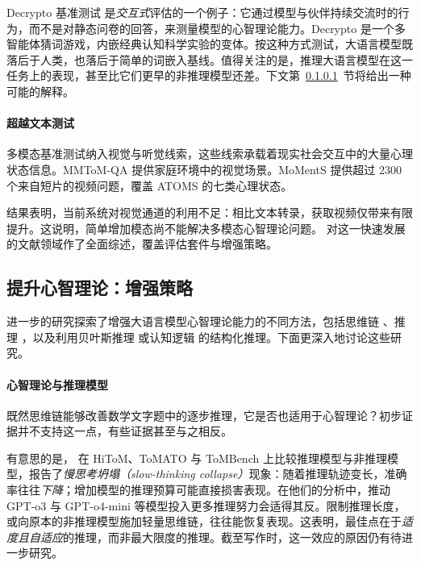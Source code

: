 Decrypto 基准测试 \citep{lupu2025decrypto} 是\emph{交互式}评估的一个例子：它通过模型与伙伴持续交流时的行为，而不是对静态问卷的回答，来测量模型的心智理论能力。Decrypto 是一个多智能体猜词游戏，内嵌经典认知科学实验的变体。按这种方式测试，大语言模型既落后于人类，也落后于简单的词嵌入基线。值得关注的是，推理大语言模型在这一任务上的表现，甚至比它们更早的非推理模型还差。下文第~\ref{sec:tomreasoning}~节将给出一种可能的解释。

\paragraph{超越文本测试}
多模态基准测试纳入视觉与听觉线索，这些线索承载着现实社会交互中的大量心理状态信息。MMToM-QA \cite{jin2024mmtomqamultimodaltheorymind} 提供家庭环境中的视觉场景。MoMentS \citep{villa2025moments} 提供超过 2300 个来自短片的视频问题，覆盖 ATOMS 的七类心理状态。

结果表明，当前系统对视觉通道的利用不足：相比文本转录，获取视频仅带来有限提升。这说明，简单增加模态尚不能解决多模态心智理论问题。\citet{chen-etal-2025-theory} 对这一快速发展的文献领域作了全面综述，覆盖评估套件与增强策略。

\subsection{提升心智理论：增强策略} \label{sec:enhancement}
进一步的研究探索了增强大语言模型心智理论能力的不同方法，包括思维链 \citep{moghaddam2023boostingtheoryofmindperformancelarge}、推理 \citep{kim2025hypothesis}，以及利用贝叶斯推理 \citep{jin2024mmtomqamultimodaltheorymind}或认知逻辑 \citep{wuDELToMInferenceTimeScaling2025a}的结构化推理。下面更深入地讨论这些研究。

\paragraph{心智理论与推理模型} \label{sec:tomreasoning}
既然思维链能够改善数学文字题中的逐步推理，它是否也适用于心智理论？初步证据并不支持这一点，有些证据甚至与之相反。

有意思的是，\citet{gong2026think} 在 HiToM、ToMATO 与 ToMBench 上比较推理模型与非推理模型，报告了{\em 慢思考坍塌（slow-thinking collapse）}现象：随着推理轨迹变长，准确率往往\emph{下降}；增加模型的推理预算可能直接损害表现。在他们的分析中，推动 GPT-o3 与 GPT-o4-mini 等模型投入更多推理努力会适得其反。限制推理长度，或向原本的非推理模型施加轻量思维链，往往能恢复表现。这表明，最佳点在于\emph{适度且自适应}的推理，而非最大限度的推理。截至写作时，这一效应的原因仍有待进一步研究。

